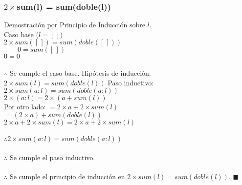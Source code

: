 \documentclass[11pt,letterpaper]{article}
\begin{document}
      \subsubsection{$2\times$sum(l) = sum(doble(l))}
         Demostración por Principio de Inducción sobre $ l $.\\
          Caso base ($ l = [\,]$)\\
         $ 2 \times sum([\,]) = sum(doble([\,])) $ \\
         $ \qquad 0 = sum([\,]) $ \\
         $ 0 = 0 $ \\ \\
         $ \therefore $ Se cumple el caso base.
         Hipótesis de inducción: $ 2 \times sum(l) = sum(doble(l)) $
         Paso inductivo: $ 2 \times sum(a:l) = sum(doble(a:l)) $ \\
         $ 2 \times(a:l) = 2 \times (a + sum(l)) $ \\
         Por otro lado: $ = 2 \times a + 2 \times sum(l) $ \\
         $ = (2 \times a) + sum(doble(l)) $ \\
         $ 2 \times a + 2 \times sum(l) = 2 \times a + 2 \times sum(l) $ \\ \\
         $ \therefore 2 \times sum(a:l) = sum(doble(a:l)) $ \\ \\
         $ \therefore $ Se cumple el paso inductivo.\\ \\
         $ \therefore $ Se cumple el principio de inducción en $ 2 \times sum(l) = sum(doble(l)) $. $ \blacksquare $
\end{document}
